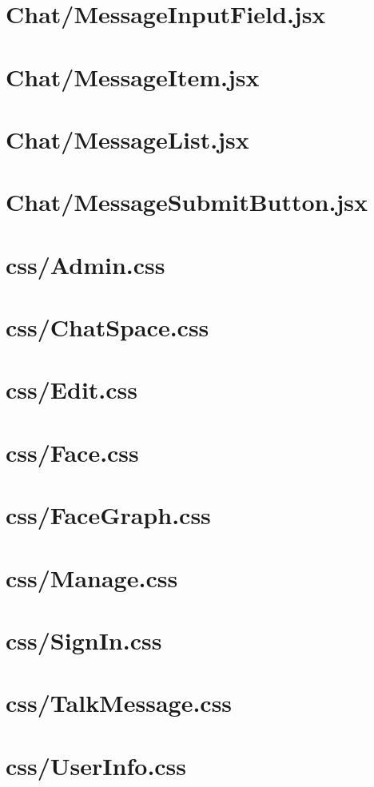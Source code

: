 \section{Chat/MessageInputField.jsx}
{\tiny }

\section{Chat/MessageItem.jsx}
{\tiny }

\section{Chat/MessageList.jsx}
{\tiny }

\section{Chat/MessageSubmitButton.jsx}
{\tiny }

\section{css/Admin.css}
{\tiny }

\section{css/ChatSpace.css}
{\tiny }

\section{css/Edit.css}
{\tiny }

\section{css/Face.css}
{\tiny }

\section{css/FaceGraph.css}
{\tiny }

\section{css/Manage.css}
{\tiny }

\section{css/SignIn.css}
{\tiny }

\section{css/TalkMessage.css}
{\tiny }

\section{css/UserInfo.css}
{\tiny }